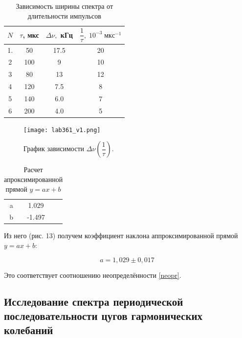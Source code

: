 \documentclass[a4paper, 14pt]{extarticle}%
\begin{document}
  	\begin{table}[]
  		\caption{Зависимость ширины спектра от длительности импульсов}
  		\begin{center}
  			\begin{tabular}{|c|c|c|c|}
  			\hline
  			$ N $ & $ \tau $, мкс & $ \Delta\nu, $ кГц  & $ \dfrac{1}{\tau}, \; 10^{-3} \; мкс^{-1}$ \\
  			\hline
  			1. & 50 & 17.5 & 20 \\
  				\hline
  			2 & 100 & 9 & 10 \\
  				\hline
  			3 & 80 & 13 & 12 \\
  				\hline
  			4 & 120 & 7.5 & 8 \\
  				\hline
  			5 & 140 & 6.0 & 7 \\
  				\hline
  			6 & 200 & 4.0 & 5 \\
  				\hline
  			\end{tabular}
  		\end{center}
  	\label{A_table}
  	\end{table}
  	
  	\begin{figure}[h!]
  		\label{A_graf}
  		\texttt{[image: lab361\_v1.png]}
  		\caption{График зависимости $ \Delta \nu \left (\dfrac{1}{\tau} \right ) $. }
  	\end{figure}
  	

  	\begin{table}[h!]
  		\centering
  		\caption{Расчет апроксимированной прямой $ y = ax +b $}
  		\begin{tabular}{c|cc}
  			\text{} & \text{Estimate} & \\
  			\hline
  			a  & 1.029 & \\
  			b  & -1.497 &  \\
  			\hline
  		\end{tabular}
  	\end{table}
  	
  
  	
  	Из него (рис. 13) получем коэффициент наклона аппроксимированной прямой $ y = ax + b $:  
  	
  	\begin{equation}\label{}
  	a = 1,029 \pm 0,017 
  	\end{equation}
  	
  	Это соответствует соотношению неопределённости \eqref{neopr}. 
  	
  	\subsection{Исследование спектра периодической последовательности цугов гармонических колебаний}
  	
\end{document}
